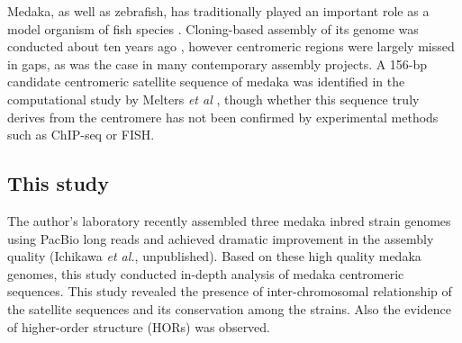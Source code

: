   Medaka, as well as zebrafish, has traditionally played an important role as a model organism of fish species \cite{Wittbrodt2002}. Cloning-based assembly of its genome was conducted about ten years ago \cite{Kasahara2007}, however centromeric regions were largely missed in gaps, as was the case in many contemporary assembly projects. A 156-bp candidate centromeric satellite sequence of medaka was identified in the computational study by Melters \textit{et al} \cite{Melters2013}, though whether this sequence truly derives from the centromere has not been confirmed by experimental methods such as ChIP-seq or FISH.


\subsection*{This study}
  The author's laboratory recently assembled three medaka inbred strain genomes using PacBio long reads and achieved dramatic improvement in the assembly quality (Ichikawa \textit{et al.}, unpublished). Based on these high quality medaka genomes, this study conducted in-depth analysis of medaka centromeric sequences. This study revealed the presence of inter-chromosomal relationship of the satellite sequences and its conservation among the strains. Also the evidence of higher-order structure (HORs) was observed.
